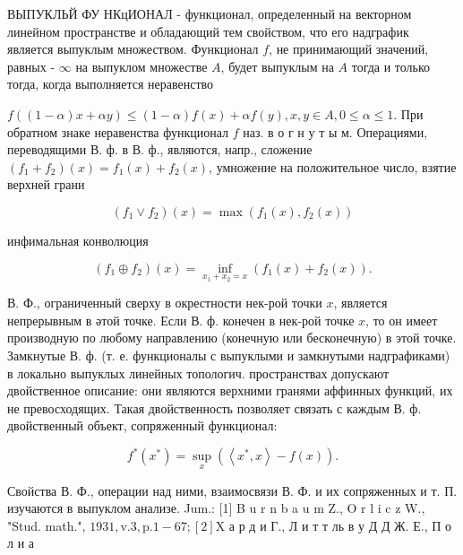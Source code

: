 \documentclass[10pt]{article}
\begin{document}
ВЫПУКЛЬЙ ФУ НКцИОНАЛ - функционал, определенный на векторном линейном пространстве и обладающий тем свойством, что его надграфик является выпуклым множеством. Функционал $f$, не принимающий значений, равных - $\infty$ на выпуклом множестве $A$, будет выпуклым на $A$ тогда и только тогда, когда выполняется неравенство



$f((1-\alpha) x+\alpha y) \leqslant(1-\alpha) f(x)+\alpha f(y), x, y \in A, 0 \leqslant \alpha \leqslant 1$. При обратном знаке неравенства функционал $f$ наз. в о г н у т ы м. Операциями, переводящими В. ф. в В. ф., являются, напр., сложение $\left(f_{1}+f_{2}\right)(x)=f_{1}(x)+f_{2}(x)$, умножение на положительное число, взятие верхней грани



\[

\left(f_{1} \vee f_{2}\right)(x)=\max \left(f_{1}(x), f_{2}(x)\right)

\]



инфимальная конволюция



\[

\left(f_{1} \oplus f_{2}\right)(x)=\inf _{x_{1}+x_{2}=x}\left(f_{1}(x)+f_{2}(x)\right) .

\]



В. Ф., ограниченный сверху в окрестности нек-рой точки $x$, является непрерывным в әтой точке. Если В. ф. конечен в нек-рой точке $x$, то он имеет производную по любому направлению (конечную или бесконечную) в этой точке. Замкнутые В. ф. (т. е. функционалы с выпуклыми и замкнутыми надграфиками) в локально выпуклых линейных топологич. пространствах допускают двойственное описание: они являются верхними гранями аффинных функций, их не превосходящих. Такая двойственность позволяет связать с каждым В. ф. двойственный объект, сопряженный функционал:



\[

f^{*}\left(x^{*}\right)=\sup _{x}\left(\left\langle x^{*}, x\right\rangle-f(x)\right) .

\]



Свойства В. Ф., операции над ними, взаимосвязи В. Ф. и их сопряженных и т. П. изучаются в выпуклом анализе. Jum.: [1] B u r n b a u m Z., O r l i c z W., "Stud. math.", $1931, \mathrm{v} .3, \mathrm{p} .1-67 ;[2] \mathrm{X}$ а р д и Г., Л и т т ль в у Д Д Ж. Е., П о л и а
\end{document}
